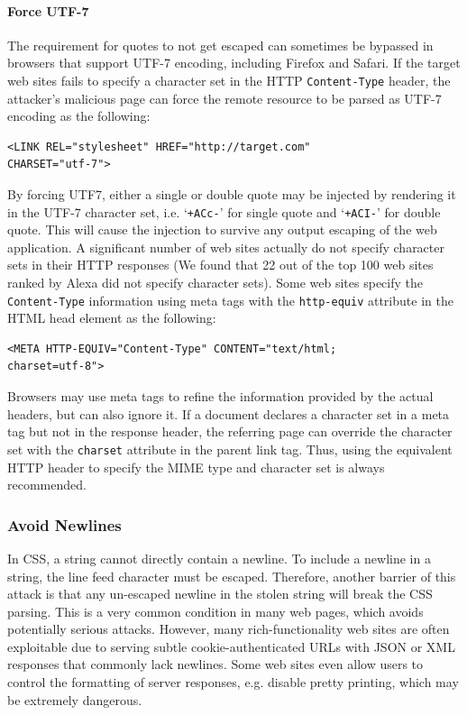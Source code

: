 \documentclass{acm_proc_article-sp}
\begin{document}
{\paragraph{Force UTF-7}
The requirement for quotes to not get escaped can sometimes be bypassed in browsers that support UTF-7 encoding, including Firefox and Safari. If the target web sites fails to specify a character set in the HTTP \texttt{Content-Type} header, the attacker's malicious page can force the remote resource to be parsed as UTF-7 encoding as the following:
\begin{verbatim}
<LINK REL="stylesheet" HREF="http://target.com" 
CHARSET="utf-7">
\end{verbatim}
By forcing UTF7, either a single or double quote may be injected by rendering it in the UTF-7 character set, i.e. `\texttt{+ACc-}' for single quote and `\texttt{+ACI-}' for double quote. This will cause the injection to survive any output escaping of the web application. A significant number of web sites actually do not specify character sets in their HTTP responses (We found that 22 out of the top 100 web sites ranked by Alexa\cite{alexa} did not specify character sets). Some web sites specify the \texttt{Content-Type} information using meta tags with the \texttt{http-equiv} attribute in the HTML head element as the following:
\begin{verbatim}
<META HTTP-EQUIV="Content-Type" CONTENT="text/html; 
charset=utf-8">
\end{verbatim}
Browsers may use meta tags to refine the information provided by the actual headers, but can also ignore it. If a document declares a character set in a meta tag but not in the response header, the referring page can override the character set with the \texttt{charset} attribute in the parent link tag. Thus, using the equivalent HTTP header to specify the MIME type and character set is always recommended.

\subsubsection{Avoid Newlines}
In CSS, a string cannot directly contain a newline. To include a newline in a string, the line feed character must be escaped. Therefore, another barrier of this attack is that any un-escaped newline in the stolen string will break the CSS parsing. This is a very common condition in many web pages, which avoids potentially serious attacks. However, many rich-functionality web sites are often exploitable due to serving subtle cookie-authenticated URLs with JSON or XML responses that commonly lack newlines. Some web sites even allow users to control the formatting of server responses, e.g. disable pretty printing, which may be extremely dangerous.
}
\end{document}
